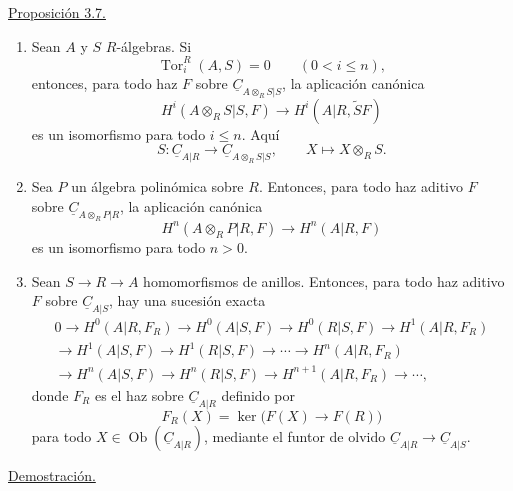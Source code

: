 
\underline{Proposición 3.7.}

\begin{enumerate}[label=(\alph*)]
\item Sean $A$ y $S$ $R$-álgebras. Si
\[
 \operatorname{Tor}_i^R(A,S)=0\qquad(0<i\leq n),
\]
entonces, para todo haz $F$ sobre
$\underline C_{A\otimes_RS|S}$, la aplicación canónica
\[
 H^i(A\otimes_RS|S,F)
 \longrightarrow H^i(A|R,\widetilde SF)
\]
es un isomorfismo para todo $i\leq n$. Aquí
\[
 S:\underline C_{A|R}\longrightarrow
 \underline C_{A\otimes_RS|S},
 \qquad X\longmapsto X\otimes_RS.
\]

\item Sea $P$ un álgebra polinómica sobre $R$. Entonces, para todo haz
aditivo $F$ sobre $\underline C_{A\otimes_RP|R}$, la aplicación
canónica
\[
 H^n(A\otimes_RP|R,F)\longrightarrow H^n(A|R,F)
\]
es un isomorfismo para todo $n>0$.

\item Sean $S\longrightarrow R\longrightarrow A$ homomorfismos de
anillos. Entonces, para todo haz aditivo $F$ sobre
$\underline C_{A|S}$, hay una sucesión exacta
\begin{multline*}
0\longrightarrow H^0(A|R,F_R)\longrightarrow H^0(A|S,F)
\longrightarrow H^0(R|S,F)\longrightarrow H^1(A|R,F_R)\\
\longrightarrow H^1(A|S,F)\longrightarrow H^1(R|S,F)
\longrightarrow\cdots\longrightarrow H^n(A|R,F_R)\\
\longrightarrow H^n(A|S,F)\longrightarrow H^n(R|S,F)
\longrightarrow H^{n+1}(A|R,F_R)\longrightarrow\cdots,
\end{multline*}
donde $F_R$ es el haz sobre $\underline C_{A|R}$ definido por
\[
 F_R(X)=\ker\bigl(F(X)\longrightarrow F(R)\bigr)
\]
para todo $X\in\operatorname{Ob}(\underline C_{A|R})$, mediante el
funtor de olvido
$\underline C_{A|R}\longrightarrow\underline C_{A|S}$.
\end{enumerate}

\underline{Demostración.}

